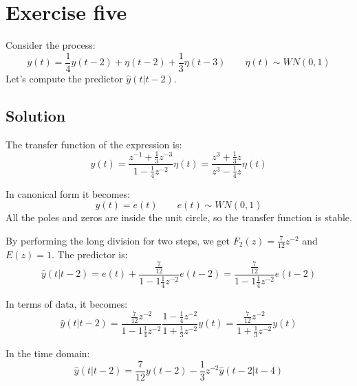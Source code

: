 \section{Exercise five}

Consider the process: 
\[y(t)=\dfrac{1}{4}y(t-2)+\eta(t-2)+\dfrac{1}{3}\eta(t-3)\qquad \eta(t)\sim WN(0,1)\]
Let's compute the predictor $\hat{y}(t|t-2)$. 

\subsection*{Solution}
The transfer function of the expression is:
\[y(t)=\dfrac{z^{-1}+\frac{1}{3}z^{-3}}{1-\frac{1}{4}z^{-2}}\eta(t)=\dfrac{z^3+\frac{1}{3}z}{z^3-\frac{1}{4}z}\eta(t)\]

In canonical form it becomes: 
\[y(t)=e(t)\qquad e(t)\sim WN(0,1)\]
All the poles and zeros are inside the unit circle, so the transfer function is stable.

By performing the long division for two steps, we get $F_2(z)=\frac{7}{12}z^{-2}$ and $E(z)=1$. 
The predictor is: 
\[\hat{y}(t|t-2)=e(t)+\dfrac{\frac{7}{12}}{1-1\frac{1}{4}z^{-2}}e(t-2)=\dfrac{\frac{7}{12}}{1-1\frac{1}{4}z^{-2}}e(t-2)\]

In terms of data, it becomes:
\[\hat{y}(t|t-2)=\dfrac{\frac{7}{12}z^{-2}}{1-1\frac{1}{4}z^{-2}}\dfrac{1-\frac{1}{4}z^{-2}}{1+\frac{1}{3}z^{-2}}y(t)=\dfrac{\frac{7}{12}z^{-2}}{1+\frac{1}{3}z^{-2}}y(t)\]

In the time domain:
\[\hat{y}(t|t-2)=\frac{7}{12}y(t-2)-\frac{1}{3}z^{-2}\hat{y}(t-2|t-4)\]